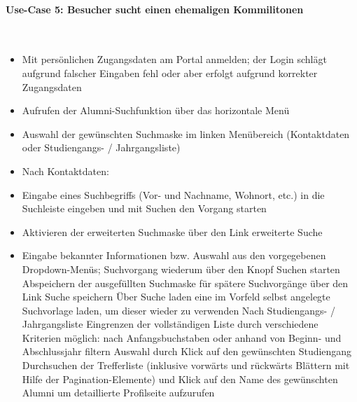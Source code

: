 \paragraph{Use-Case 5: Besucher sucht einen ehemaligen Kommilitonen}\quad \\
\begin{itemize}

\item Mit persönlichen Zugangsdaten am Portal anmelden; der Login schlägt aufgrund falscher Eingaben fehl oder aber erfolgt aufgrund korrekter Zugangsdaten
\item Aufrufen der Alumni-Suchfunktion über das horizontale Menü
\item Auswahl der gewünschten Suchmaske im linken Menübereich (Kontaktdaten oder Studiengangs- / Jahrgangsliste)
\item Nach Kontaktdaten:
\item Eingabe eines Suchbegriffs (Vor- und Nachname, Wohnort, etc.) in die Suchleiste eingeben und mit Suchen den Vorgang starten
\item Aktivieren der erweiterten Suchmaske über den Link erweiterte Suche
\item Eingabe bekannter Informationen bzw. Auswahl aus den vorgegebenen Dropdown-Menüs; Suchvorgang wiederum über den Knopf Suchen starten
Abspeichern der ausgefüllten Suchmaske für spätere Suchvorgänge über den Link Suche speichern
Über Suche laden eine im Vorfeld selbst angelegte Suchvorlage laden, um dieser wieder zu verwenden
Nach Studiengangs- / Jahrgangsliste
Eingrenzen der vollständigen Liste durch verschiedene Kriterien möglich: nach Anfangsbuchstaben oder anhand von Beginn- und Abschlussjahr filtern
Auswahl durch Klick auf den gewünschten Studiengang
Durchsuchen der Trefferliste (inklusive vorwärts und rückwärts Blättern mit Hilfe der Pagination-Elemente) und Klick auf den Name des gewünschten Alumni um detaillierte Profilseite aufzurufen
\end{itemize}